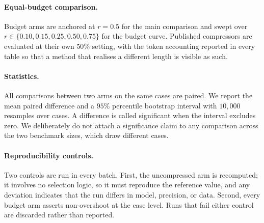 \paragraph{Equal-budget comparison.}
Budget arms are anchored at $r=0.5$ for the main comparison and swept over
$r\in\{0.10,0.15,0.25,0.50,0.75\}$ for the budget curve. Published compressors are
evaluated at their own $50\%$ setting, with the token accounting reported in every table so
that a method that realises a different length is visible as such.

\paragraph{Statistics.}
All comparisons between two arms on the same cases are paired. We report the mean paired
difference and a $95\%$ percentile bootstrap interval with $10{,}000$ resamples over cases.
A difference is called significant when the interval excludes zero. We deliberately do not
attach a significance claim to any comparison across the two benchmark sizes, which draw
different cases.

\paragraph{Reproducibility controls.}
Two controls are run in every batch. First, the uncompressed arm is recomputed; it involves
no selection logic, so it must reproduce the reference value, and any deviation indicates
that the run differs in model, precision, or data. Second, every budget arm asserts
non-overshoot at the case level. Runs that fail either control are discarded rather than
reported.
